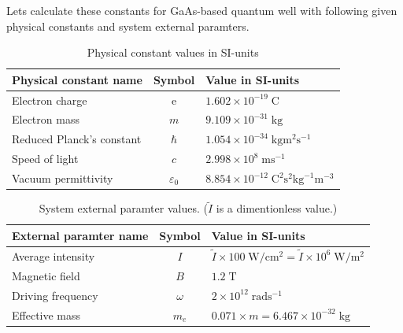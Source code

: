 \noindent
Lets calculate these constants for GaAs-based quantum well with following given physical constants and system external paramters.

\begin{table}[ht!]
\begin{center}
\begin{tabular}{ |l|c|l| }
 \hline
 \textbf{Physical constant name} & \textbf{Symbol} & \textbf{Value in SI-units} \\ [0.5ex] \hline\hline
 Electron charge  & e & $1.602\times10^{-19} \;\text{C}$ \\ \hline
 Electron mass & $m$ & $9.109\times10^{-31}\; \text{kg}$ \\ \hline
 Reduced Planck's constant &  $\hbar$ & $1.054\times10^{-34} \;\text{kg}\text{m}^2\text{s}^{-1}$ \\ \hline
 Speed of light & $c$ & $2.998\times10^8\; \text{ms}^{-1}$ \\ \hline
 Vacuum permittivity & $\varepsilon_0$ & $8.854\times10^{-12}\; \text{C}^{2}\text{s}^2\text{kg}^{-1}\text{m}^{-3}$ \\ \hline
\end{tabular}
\caption {\label{tab:5.1}Physical constant values in SI-units}
\end{center}
\end{table}

\begin{table}[ht!]
\begin{center}
\begin{tabular}{ |l|c|l| }
 \hline
 \textbf{External paramter name} & \textbf{Symbol} & \textbf{Value in SI-units} \\ [0.5ex] \hline\hline
 Average intensity  & $I$ & $\tilde{I} \times 100\;\text{W}/\text{cm}^{2} = \tilde{I}\times10^6\;\text{W}/\text{m}^{2}$ \\ \hline
 Magnetic field & $B$ & $1.2\;\text{T}$ \\ \hline
 Driving frequency & $\omega$ & $2\times10^{12} \;\text{rad}\text{s}^{-1}$ \\ \hline
 Effective mass &  $m_e$ & $0.071\times m = 6.467 \times10^{-32} \; \text{kg}$ \\ \hline
\end{tabular}
\caption {\label{tab:5.2}System external paramter values. (${\tilde{I}}$ is a dimentionless value.)}
\end{center}
\end{table}

